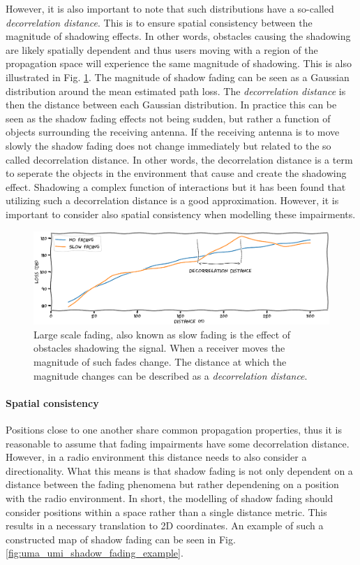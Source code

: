 However, it is also important to note that such distributions have a so-called \emph{decorrelation distance}. This is to ensure spatial consistency between the magnitude of shadowing effects. In other words, obstacles causing the shadowing are likely spatially dependent and thus users moving with a region of the propagation space will experience the same magnitude of shadowing. This is also illustrated in Fig. \ref{fig:shadowing_decorrelation_distance}. The magnitude of shadow fading can be seen as a Gaussian distribution around the mean estimated path loss. The \emph{decorrelation distance} is then the distance between each Gaussian distribution. In practice this can be seen as the shadow fading effects not being sudden, but rather a function of objects surrounding the receiving antenna. If the receiving antenna is to move slowly the shadow fading does not change immediately but related to the so called decorrelation distance. In other words, the decorrelation distance is a term to seperate the objects in the environment that cause and create the shadowing effect. Shadowing a complex function of interactions but it has been found that utilizing such a decorrelation distance is a good approximation. However, it is important to consider also spatial consistency when modelling these impairments.


\begin{figure}[h]
    \centering
    \includegraphics{chapters/part_pathloss/figures/slowfading.eps}
    \caption{Large scale fading, also known as slow fading is the effect of obstacles shadowing the signal. When a receiver moves  the magnitude of such fades change. The distance at which the magnitude changes can be described as a \emph{decorrelation distance}.}
    \label{fig:shadowing_decorrelation_distance}
\end{figure}



\paragraph{Spatial consistency}
Positions close to one another share common propagation properties, thus it is reasonable to assume that fading impairments have some decorrelation distance. However, in a radio environment this distance needs to also consider a directionality. What this means is that shadow fading is not only dependent on a distance between the fading phenomena but rather dependening on a position with the radio environment. In short, the modelling of shadow fading should consider positions within a space rather than a single distance metric. This results in a necessary translation to 2D coordinates. An example of such a constructed map of shadow fading can be seen in Fig. \ref{fig:uma_umi_shadow_fading_example}.


